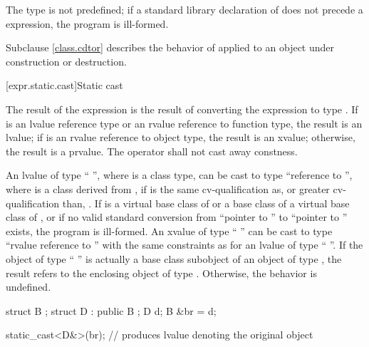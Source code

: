 \pnum
The type  is not predefined;
if a standard library declaration of
 does not precede
a  expression, the program is ill-formed.

\pnum
\begin{note}
Subclause \ref{class.cdtor} describes the behavior of 
applied to an object under construction or destruction.
\end{note}

[expr.static.cast]{Static cast}

\pnum
{}%
%
The result of the expression  is the result of
converting the expression  to type .
%
%
If  is an lvalue reference type
or an rvalue reference to function type, the result is an lvalue;
if  is an rvalue reference to object type, the result is an xvalue;
otherwise, the result is a prvalue. The  operator shall not cast
away constness.

\pnum
{}%
%
An lvalue of type `` '', where  is a class
type, can be cast to type ``reference to  '', where
 is a class derived from ,
if  is the
same cv-qualification as, or greater cv-qualification than,
. If  is a virtual base class of 
or a base class of a virtual base class of ,
or if no valid standard conversion from ``pointer to ''
to ``pointer to '' exists, the program is ill-formed.
An xvalue of type
`` '' can be cast to type ``rvalue reference to
 '' with the same constraints as for an lvalue of
type `` ''. If the object
of type `` '' is actually a base class subobject of an object
of type , the result refers to the enclosing object of type
. Otherwise, the behavior is undefined.
\begin{example}
\begin{codeblock}
struct B { };
struct D : public B { };
D d;
B &br = d;

static_cast<D&>(br);            // produces lvalue denoting the original  object
\end{codeblock}
\end{example}

